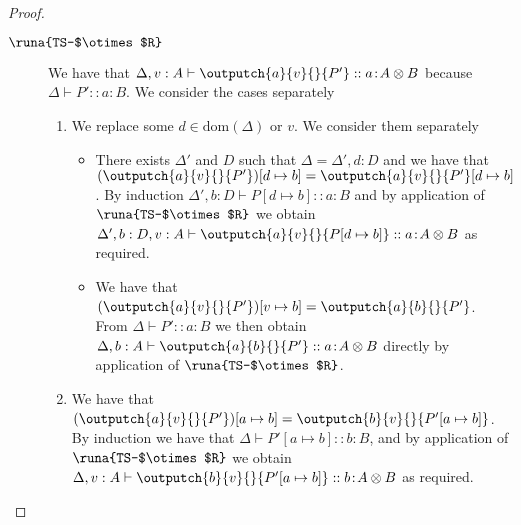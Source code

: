 \begin{lemma}
\begin{proof}
\begin{description}
\item[$\runa{TS-$\otimes$R}$] We have that $\Delta,v:A\vdash \outputch{a}{v}{}{P'} :: a\!:\!A\otimes B$ because $\Delta\vdash P' :: a\!:\!B$. We consider the cases separately
\begin{enumerate}
    \item We replace some $d\in\text{dom}(\Delta)$ or $v$. We consider them separately
    \begin{itemize}
        \item There exists $\Delta'$ and $D$ such that $\Delta=\Delta',d:D$ and we have that $(\outputch{a}{v}{}{P'})[d\mapsto b]=\outputch{a}{v}{}{P'}[d\mapsto b]$. By induction $\Delta',b:D\vdash P[d\mapsto b] :: a\!:\!B$ and by application of $\runa{TS-$\otimes$R}$ we obtain $\Delta',b:D,v:A\vdash \outputch{a}{v}{}{P[d\mapsto b]} :: a\!:\!A\otimes B$ as required. 
        
        \item We have that $(\outputch{a}{v}{}{P'})[v\mapsto b]=\outputch{a}{b}{}{P'}$. From $\Delta\vdash P' :: a\!:\!B$ we then obtain $\Delta,b:A\vdash \outputch{a}{b}{}{P'} :: a\!:\!A\otimes B$ directly by application of $\runa{TS-$\otimes$R}$.
    \end{itemize}
    
    \item We have that $(\outputch{a}{v}{}{P'})[a\mapsto b]=\outputch{b}{v}{}{P'[a\mapsto b]}$. By induction we have that $\Delta\vdash P'[a\mapsto b] :: b\!:\!B$, and by application of $\runa{TS-$\otimes$R}$ we obtain $\Delta,v:A \vdash \outputch{b}{v}{}{P'[a\mapsto b]} :: b\!:\!A\otimes B$ as required.
\end{enumerate}



\end{description}
\end{proof}
\end{lemma}
